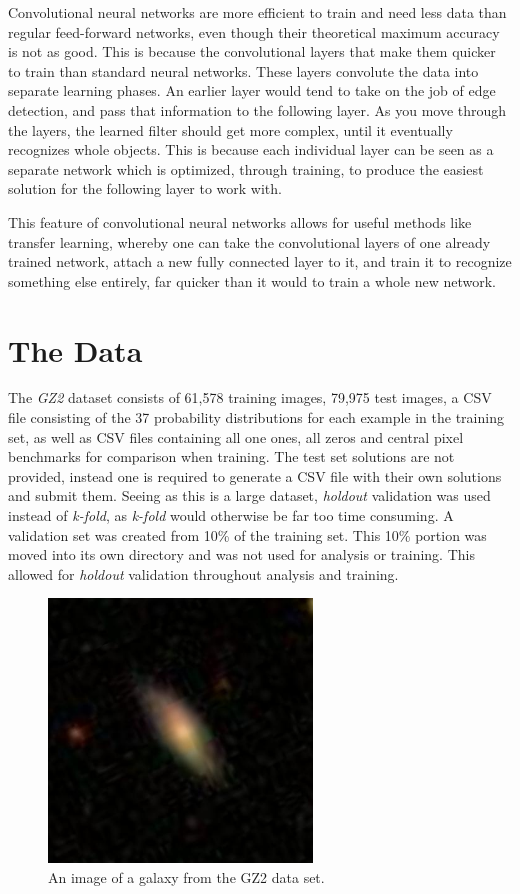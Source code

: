 \documentclass[12pt,a4paper,oneside,oldfontcommands]{memoir}
\begin{document}
\begin{Declaration Of OriginalityOrginality}
Convolutional neural networks are more efficient to train and need less data than regular feed-forward networks, even though their theoretical maximum accuracy is not as good. This is because the convolutional layers that make them quicker to train than standard neural networks. These layers convolute the data into separate learning phases. An earlier layer would tend to take on the job of edge detection, and pass that information to the following layer. As you move through the layers, the learned filter should get more complex, until it eventually recognizes whole objects. This is because each individual layer can be seen as a separate network which is optimized, through training, to produce the easiest solution for the following layer to work with. 

This feature of convolutional neural networks allows for useful methods like transfer learning, whereby one can take the convolutional layers of one already trained network, attach a new fully connected layer to it, and train it to recognize something else entirely, far quicker than it would to train a whole new network.


\chapter{The Data}

The \textit{GZ2} dataset consists of 61,578 training images, 79,975 test images, a CSV file consisting of the 37 probability distributions for each example in the training set, as well as CSV files containing all one ones, all zeros and central pixel benchmarks for comparison when training. The test set solutions are not provided, instead one is required to generate a CSV file with their own solutions and submit them. Seeing as this is a large dataset, \textit{holdout} validation was used instead of \textit{k-fold}, as \textit{k-fold} would otherwise be far too time consuming. A validation set was created from 10\% of the training set. This 10\% portion was moved into its own directory and was not used for analysis or training. This allowed for \textit{holdout} validation throughout analysis and training.


    \begin{figure}[ht]
    \center
      \includegraphics[width=7cm]{images/100023.jpg}
      \caption{An image of a galaxy from the GZ2 data set.}
      \label{fig:GZ2-1}
    \end{figure}
      


\end{Declaration Of OriginalityOrginality}
\end{document}
